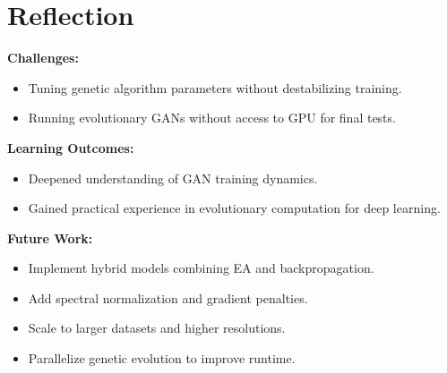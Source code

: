 \documentclass[12pt]{article}
\begin{document}
\section{Reflection}
\textbf{Challenges:}
\begin{itemize}
    \item Tuning genetic algorithm parameters without destabilizing training.
    \item Running evolutionary GANs without access to GPU for final tests.
\end{itemize}

\textbf{Learning Outcomes:}
\begin{itemize}
    \item Deepened understanding of GAN training dynamics.
    \item Gained practical experience in evolutionary computation for deep learning.
\end{itemize}

\textbf{Future Work:}
\begin{itemize}
    \item Implement hybrid models combining EA and backpropagation.
    \item Add spectral normalization and gradient penalties.
    \item Scale to larger datasets and higher resolutions.
    \item Parallelize genetic evolution to improve runtime.
\end{itemize}
\end{document}
